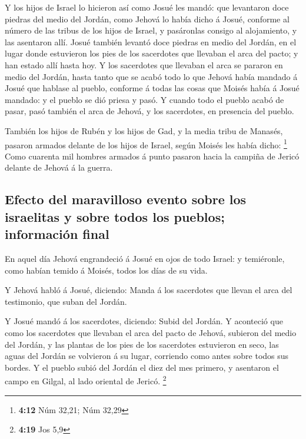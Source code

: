  Y los hijos de Israel lo hicieron así como Josué les
mandó: que levantaron doce piedras del medio del Jordán, como Jehová lo
había dicho á Josué, conforme al número de las tribus de los hijos de
Israel, y pasáronlas consigo al alojamiento, y las asentaron allí.
 Josué también levantó doce piedras en medio del Jordán,
en el lugar donde estuvieron los pies de los sacerdotes que llevaban el
arca del pacto; y han estado allí hasta hoy.  Y los
sacerdotes que llevaban el arca se pararon en medio del Jordán, hasta
tanto que se acabó todo lo que Jehová había mandado á Josué que hablase
al pueblo, conforme á todas las cosas que Moisés había á Josué mandado:
y el pueblo se dió priesa y pasó.  Y cuando todo el
pueblo acabó de pasar, pasó también el arca de Jehová, y los sacerdotes,
en presencia del pueblo.

 También los hijos de Rubén y los hijos de Gad, y la
media tribu de Manasés, pasaron armados delante de los hijos de Israel,
según Moisés les había dicho: \footnote{\textbf{4:12} Núm 32,21; Núm
  32,29}  Como cuarenta mil hombres armados á punto
pasaron hacia la campiña de Jericó delante de Jehová á la guerra.

\hypertarget{efecto-del-maravilloso-evento-sobre-los-israelitas-y-sobre-todos-los-pueblos-informaciuxf3n-final}{%
\subsection{Efecto del maravilloso evento sobre los israelitas y sobre
todos los pueblos; información
final}\label{efecto-del-maravilloso-evento-sobre-los-israelitas-y-sobre-todos-los-pueblos-informaciuxf3n-final}}

 En aquel día Jehová engrandeció á Josué en ojos de todo
Israel: y temiéronle, como habían temido á Moisés, todos los días de su
vida.

 Y Jehová habló á Josué, diciendo:  Manda
á los sacerdotes que llevan el arca del testimonio, que suban del
Jordán.

 Y Josué mandó á los sacerdotes, diciendo: Subid del
Jordán.  Y aconteció que como los sacerdotes que llevaban
el arca del pacto de Jehová, subieron del medio del Jordán, y las
plantas de los pies de los sacerdotes estuvieron en seco, las aguas del
Jordán se volvieron á su lugar, corriendo como antes sobre todos sus
bordes.  Y el pueblo subió del Jordán el diez del mes
primero, y asentaron el campo en Gilgal, al lado oriental de Jericó.
\footnote{\textbf{4:19} Jos 5,9}

